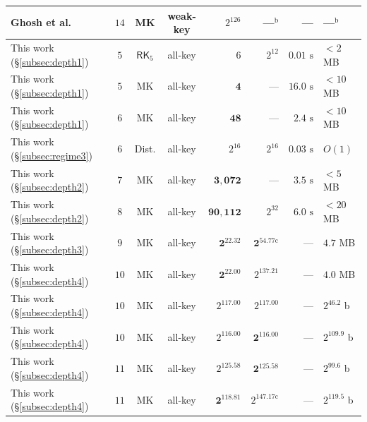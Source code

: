 \documentclass[11pt,a4paper]{article}
\theoremstyle{definition}
\theoremstyle{remark}
\begin{document}
\begin{table}[t!]
\begin{tabular}{@{}lcccrrrl@{}}
Ghosh et al.~\cite{GMNP25}          & $14$          & MK           & weak-key & $2^{126}$                & ---$^{\mathrm{b}}$         & ---           & ---$^{\mathrm{b}}$ \\
\midrule
This work (\S\ref{subsec:depth1})   & $5$           & $\mathsf{RK}_5$ & all-key  & $6$                      & $2^{12}$                   & $0.01\text{ s}$ & $<2$ MB \\
This work (\S\ref{subsec:depth1})   & $5$           & MK           & all-key  & $\mathbf{4}$             & ---                        & $16.0\text{ s}$ & $<10$ MB \\
This work (\S\ref{subsec:depth1})   & $6$           & MK           & all-key  & $\mathbf{48}$            & ---                        & $2.4\text{ s}$  & $<10$ MB \\
This work (\S\ref{subsec:regime3})  & $6$           & Dist.        & all-key  & $2^{16}$                 & $2^{16}$                   & $0.03\text{ s}$ & $O(1)$ \\
This work (\S\ref{subsec:depth2})   & $7$           & MK           & all-key  & $\mathbf{3{,}072}$       & ---                        & $3.5\text{ s}$  & $<5$ MB \\
This work (\S\ref{subsec:depth2})   & $8$           & MK           & all-key  & $\mathbf{90{,}112}$      & $2^{32}$                   & $6.0\text{ s}$  & $<20$ MB \\
This work (\S\ref{subsec:depth3})   & $9$           & MK           & all-key  & $\mathbf{2^{22.32}}$     & $\mathbf{2^{54.77\mathrm{c}}}$ & ---      & $4.7$ MB \\
This work (\S\ref{subsec:depth4})   & $10$          & MK           & all-key  & $\mathbf{2^{22.00}}$     & $2^{137.21}$               & ---           & $4.0$ MB \\
This work (\S\ref{subsec:depth4})   & $10$          & MK           & all-key  & $2^{117.00}$             & $2^{117.00}$               & ---           & $2^{46.2}$ b \\
This work (\S\ref{subsec:depth4})   & $10$          & MK           & all-key  & $2^{116.00}$             & $\mathbf{2^{116.00}}$      & ---           & $2^{109.9}$ b \\
This work (\S\ref{subsec:depth4})   & $11$          & MK           & all-key  & $2^{125.58}$             & $\mathbf{2^{125.58}}$      & ---           & $2^{99.6}$ b \\
This work (\S\ref{subsec:depth4})   & $11$          & MK           & all-key  & $\mathbf{2^{118.81}}$    & $2^{147.17\mathrm{c}}$     & ---           & $2^{119.5}$ b \\

\end{tabular}
\end{table}
\end{document}
